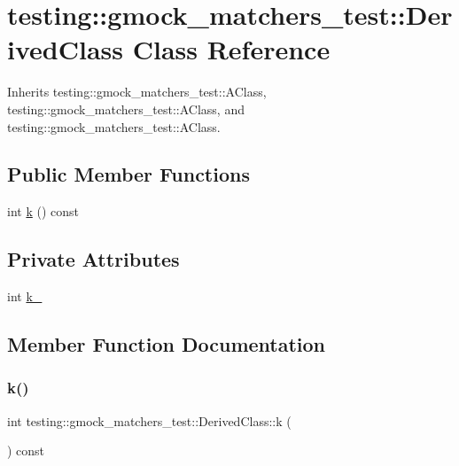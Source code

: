 \hypertarget{classtesting_1_1gmock__matchers__test_1_1_derived_class}{}\section{testing\+::gmock\+\_\+matchers\+\_\+test\+::Derived\+Class Class Reference}
\label{classtesting_1_1gmock__matchers__test_1_1_derived_class}


Inherits testing\+::gmock\+\_\+matchers\+\_\+test\+::\+A\+Class, testing\+::gmock\+\_\+matchers\+\_\+test\+::\+A\+Class, and testing\+::gmock\+\_\+matchers\+\_\+test\+::\+A\+Class.

\subsection*{Public Member Functions}
\begin{DoxyCompactItemize}
\item 
int \mbox{\hyperlink{classtesting_1_1gmock__matchers__test_1_1_derived_class_a6f8638915c84cb14365e337d99857847}{k}} () const
\end{DoxyCompactItemize}
\subsection*{Private Attributes}
\begin{DoxyCompactItemize}
\item 
int \mbox{\hyperlink{classtesting_1_1gmock__matchers__test_1_1_derived_class_a32832fb762915e658a9e1ab53dc8be02}{k\+\_\+}}
\end{DoxyCompactItemize}


\subsection{Member Function Documentation}
\mbox{\label{classtesting_1_1gmock__matchers__test_1_1_derived_class_a6f8638915c84cb14365e337d99857847}} 
\subsubsection{\texorpdfstring{k()}{k()}}
{\footnotesize\ttfamily int testing\+::gmock\+\_\+matchers\+\_\+test\+::\+Derived\+Class\+::k (\begin{DoxyParamCaption}{ }\end{DoxyParamCaption}) const\hspace{0.3cm}{\ttfamily [inline]}}



